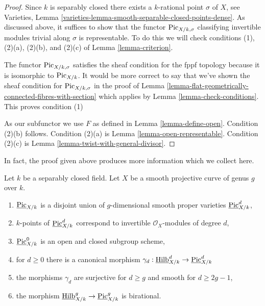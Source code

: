 \begin{proof}
Since $k$ is separably closed there exists a $k$-rational point $\sigma$
of $X$, see
Varieties, Lemma \ref{varieties-lemma-smooth-separable-closed-points-dense}.
As discussed above, it suffices to show that the functor
$\mathrm{Pic}_{X/k, \sigma}$ classifying invertible modules trivial along
$\sigma$ is representable. To do this we will check conditions (1),
(2)(a), (2)(b), and (2)(c) of
Lemma \ref{lemma-criterion}.

\medskip\noindent
The functor $\mathrm{Pic}_{X/k, \sigma}$ satisfies the sheaf condition
for the fppf topology because it is isomorphic to $\mathrm{Pic}_{X/k}$.
It would be more correct to say that we've shown the sheaf condition
for $\mathrm{Pic}_{X/k, \sigma}$ in the proof of
Lemma \ref{lemma-flat-geometrically-connected-fibres-with-section}
which applies by Lemma \ref{lemma-check-conditions}.
This proves condition (1)

\medskip\noindent
As our subfunctor we use $F$ as defined in Lemma \ref{lemma-define-open}.
Condition (2)(b) follows.
Condition (2)(a) is Lemma \ref{lemma-open-representable}.
Condition (2)(c) is Lemma \ref{lemma-twist-with-general-divisor}.
\end{proof}

\noindent
In fact, the proof given above produces more information which we
collect here.

\begin{lemma}
\label{lemma-picard-pieces}
Let $k$ be a separably closed field. Let $X$ be a smooth projective
curve of genus $g$ over $k$.
\begin{enumerate}
\item $\underline{\mathrm{Pic}}_{X/k}$ is a disjoint union of
$g$-dimensional smooth proper varieties $\underline{\mathrm{Pic}}^d_{X/k}$,
\item $k$-points of $\underline{\mathrm{Pic}}^d_{X/k}$
correspond to invertible $\mathcal{O}_X$-modules of degree $d$,
\item $\underline{\mathrm{Pic}}^0_{X/k}$
is an open and closed subgroup scheme,
\item for $d \geq 0$ there is a canonical morphism
$\gamma_d :
\underline{\mathrm{Hilb}}^d_{X/k} \to \underline{\mathrm{Pic}}^d_{X/k}$
\item the morphisms $\gamma_d$
are surjective for $d \geq g$ and smooth for $d \geq 2g - 1$,
\item the morphism
$\underline{\mathrm{Hilb}}^g_{X/k} \to \underline{\mathrm{Pic}}^g_{X/k}$
is birational.
\end{enumerate}
\end{lemma}

